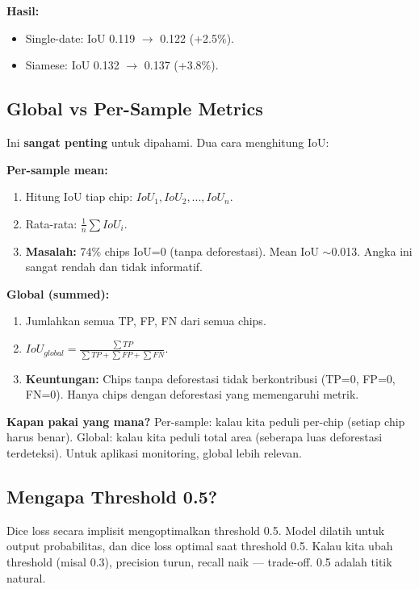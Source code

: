 \documentclass[10pt,a4paper,onecolumn]{article}
\begin{document}
\textbf{Hasil:}
\begin{itemize}[nosep]
    \item Single-date: IoU 0.119 $\rightarrow$ 0.122 (+2.5\%).
    \item Siamese: IoU 0.132 $\rightarrow$ 0.137 (+3.8\%).
\end{itemize}

\subsection{Global vs Per-Sample Metrics}

Ini \textbf{sangat penting} untuk dipahami. Dua cara menghitung IoU:

\textbf{Per-sample mean:}
\begin{enumerate}[nosep]
    \item Hitung IoU tiap chip: $IoU_1, IoU_2, ..., IoU_n$.
    \item Rata-rata: $\frac{1}{n}\sum IoU_i$.
    \item \textbf{Masalah:} 74\% chips IoU=0 (tanpa deforestasi).
          Mean IoU $\sim$0.013. Angka ini sangat rendah dan tidak
          informatif.
\end{enumerate}

\textbf{Global (summed):}
\begin{enumerate}[nosep]
    \item Jumlahkan semua TP, FP, FN dari semua chips.
    \item $IoU_{global} = \frac{\sum TP}{\sum TP + \sum FP + \sum FN}$.
    \item \textbf{Keuntungan:} Chips tanpa deforestasi tidak
          berkontribusi (TP=0, FP=0, FN=0). Hanya chips dengan
          deforestasi yang memengaruhi metrik.
\end{enumerate}

\textbf{Kapan pakai yang mana?} Per-sample: kalau kita peduli
per-chip (setiap chip harus benar). Global: kalau kita peduli total
area (seberapa luas deforestasi terdeteksi). Untuk aplikasi
monitoring, global lebih relevan.

\subsection{Mengapa Threshold 0.5?}

Dice loss secara implisit mengoptimalkan threshold 0.5. Model
dilatih untuk output probabilitas, dan dice loss optimal saat
threshold 0.5. Kalau kita ubah threshold (misal 0.3), precision
turun, recall naik — trade-off. 0.5 adalah titik natural.
\end{document}

